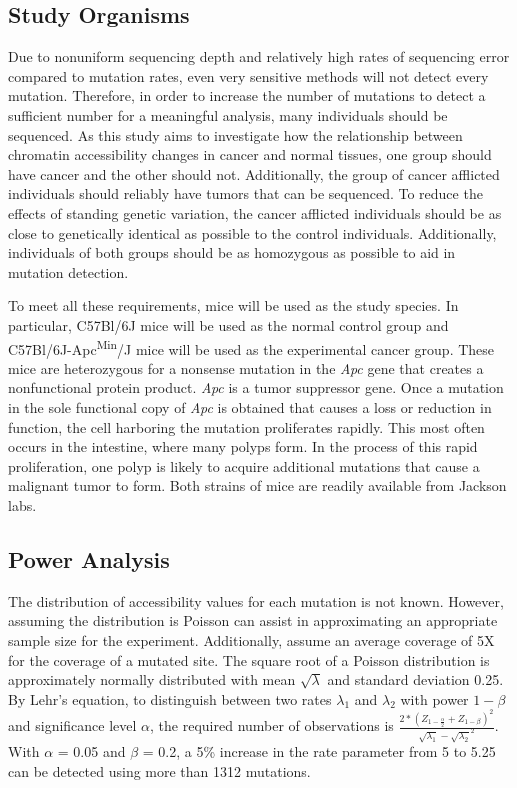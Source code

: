 \subsection{Study Organisms}
Due to nonuniform sequencing depth and relatively high rates of sequencing error compared to mutation rates, even very sensitive methods will not detect every mutation. Therefore, in order to increase the number of mutations to detect a sufficient number for a meaningful analysis, many individuals should be sequenced. As this study aims to investigate how the relationship between chromatin accessibility changes in cancer and normal tissues, one group should have cancer and the other should not.
Additionally, the group of cancer afflicted individuals should reliably have tumors that can be sequenced. To reduce the effects of standing genetic variation, the cancer afflicted individuals should be as close to genetically identical as possible to the control individuals. Additionally, individuals of both groups should be as homozygous as possible to aid in mutation detection.

To meet all these requirements, mice will be used as the study species. In particular, C57Bl/6J mice will be used as the normal control group and C57Bl/6J-Apc\textsuperscript{Min}/J mice will be used as the experimental cancer group. These mice are heterozygous for a nonsense mutation in the \textit{Apc} gene that creates a nonfunctional protein product. \textit{Apc} is a tumor suppressor gene. Once a mutation in the sole functional copy of \textit{Apc} is obtained that causes a loss or reduction in function, the cell harboring the mutation proliferates rapidly. This most often occurs in the intestine, where many polyps form. In the process of this rapid proliferation, one polyp is likely to acquire additional mutations that cause a malignant tumor to form. Both strains of mice are readily available from Jackson labs.

\subsection{Power Analysis}

The distribution of accessibility values for each mutation is not known. However, assuming the distribution is Poisson can assist in approximating an appropriate sample size for the experiment. Additionally, assume an average coverage of 5X for the coverage of a mutated site. The square root of a Poisson distribution is approximately normally distributed with mean $\sqrt{\lambda}$ and standard deviation 0.25.
By Lehr's equation, to distinguish between two rates $\lambda_1$ and $\lambda_2$ with power $1 - \beta$ and significance level $\alpha$, the required number of observations is $\frac{2 * (Z_{1 - \frac{\alpha}{2}} + Z_{1 - \beta})^2}{{\sqrt{\lambda_1} - \sqrt{\lambda_2}}^2}$. With $\alpha$ = 0.05 and $\beta$ = 0.2, a 5\% increase in the rate parameter from 5 to 5.25 can be detected using more than 1312 mutations.

